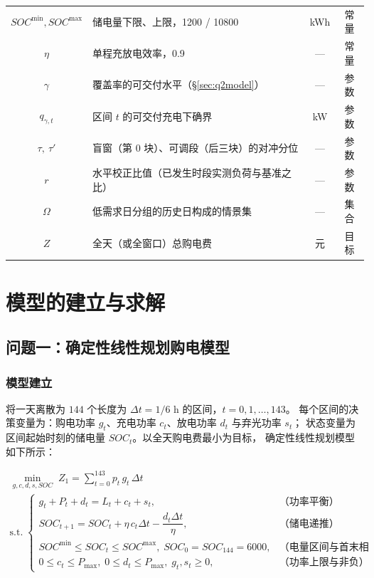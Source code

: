 \documentclass[withoutpreface]{cumcmthesis}
\begin{document}
{\begin{longtable}{c l c c}
    $SOC^{\min},SOC^{\max}$ & 储电量下限、上限，1200 / 10800          & kWh   & 常量\\
    $\eta$           & 单程充放电效率，0.9                            & ---   & 常量\\
    \midrule[1pt]
    $\gamma$         & 覆盖率的可交付水平（\S\ref{sec:q2model}）      & ---   & 参数\\
    $q_{\gamma,t}$   & 区间 $t$ 的可交付充电下确界                     & kW    & 参数\\
    $\tau,\ \tau'$   & 盲窗（第 0 块）、可调段（后三块）的对冲分位      & ---   & 参数\\
    $r$              & 水平校正比值（已发生时段实测负荷与基准之比）     & ---   & 参数\\
    $\Omega$         & 低需求日分组的历史日构成的情景集                 & ---   & 集合\\
    $Z$              & 全天（或全窗口）总购电费                        & 元    & 目标\\
    \bottomrule[1.5pt]
\end{longtable}
}

\section{模型的建立与求解}

\subsection{问题一：确定性线性规划购电模型}
\label{sec:q1model}

\subsubsection{模型建立}

将一天离散为 $144$ 个长度为 $\Delta t=1/6$ h 的区间，$t=0,1,\dots,143$。
每个区间的决策变量为：购电功率 $g_t$、充电功率 $c_t$、放电功率 $d_t$ 与弃光功率 $s_t$；
状态变量为区间起始时刻的储电量 $SOC_t$。以全天购电费最小为目标，
确定性线性规划模型如下所示：

\begin{equation}
\begin{gathered}
\min_{g,c,d,s,SOC}\; Z_1=\sum_{t=0}^{143} p_t\,g_t\,\Delta t\\[2pt]
\text{s.t.}\;
\begin{cases}
g_t+P_t+d_t=L_t+c_t+s_t, & \text{（功率平衡）}\\
SOC_{t+1}=SOC_t+\eta\,c_t\Delta t-\dfrac{d_t\Delta t}{\eta}, & \text{（储电递推）}\\
SOC^{\min}\le SOC_t\le SOC^{\max},\; SOC_0=SOC_{144}=6000,
  & \text{（电量区间与首末相等）}\\
0\le c_t\le P_{\max},\; 0\le d_t\le P_{\max},\; g_t,s_t\ge0,
  & \text{（功率上限与非负）}
\end{cases}
\end{gathered}
\label{eq:q1model}
\end{equation}
\end{document}

